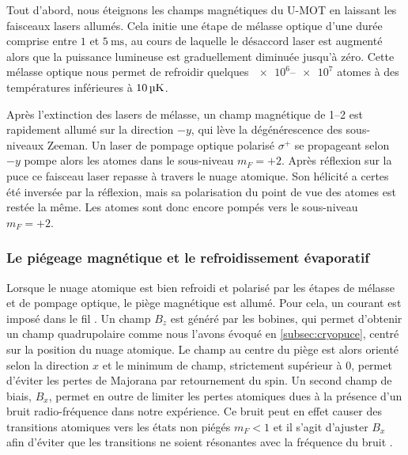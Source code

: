 Tout d'abord, nous éteignons les champs magnétiques du U-MOT en laissant les faisceaux lasers allumés.
Cela initie une étape de mélasse optique d'une durée comprise entre $\num{1}$ et $\SI{5}{\ms}$, au cours de laquelle le désaccord laser est augmenté alors que la puissance lumineuse est graduellement diminuée jusqu'à zéro.
Cette mélasse optique nous permet de refroidir quelques $\numrange{e6}{e7}$ atomes à des températures inférieures à $\SIvv{10}{\uK}$.

Après l'extinction des lasers de mélasse, un champ magnétique de \SIrange{1}{2}{\gauss} est rapidement allumé sur la direction $-y$, qui lève la dégénérescence des sous-niveaux Zeeman.
Un laser de pompage optique polarisé $\sigma ^+$ se propageant selon $-y$ pompe alors les atomes dans le sous-niveau $m_F=+2$.
Après réflexion sur la puce ce faisceau laser repasse à travers le nuage atomique.
Son hélicité a certes été inversée par la réflexion, mais sa polarisation du point de vue des atomes est restée la même.
Les atomes sont donc encore pompés vers le sous-niveau $m_F=+2$.

\subsubsection*{Le piégeage magnétique et le refroidissement évaporatif}
\noindent Lorsque le nuage atomique est bien refroidi et polarisé par les étapes de mélasse et de pompage optique, le piège magnétique est allumé.
Pour cela, un courant est imposé dans le fil .
Un champ $B_z$ est généré par les bobines, qui permet d'obtenir un champ quadrupolaire comme nous l'avons évoqué en \ref{subsec:cryopuce}, centré sur la position du nuage atomique.
Le champ au centre du piège est alors orienté selon la direction $x$ et le minimum de champ, strictement supérieur à $0$, permet d'éviter les pertes de Majorana par retournement du spin.
Un second champ de biais, $B_x$, permet en outre de limiter les pertes atomiques dues à la présence d'un bruit radio-fréquence dans notre expérience.
Ce bruit peut en effet causer des transitions atomiques vers les états non piégés $m_F<1$ et il s'agit d'ajuster $B_x$ afin d'éviter que les transitions ne soient résonantes avec la fréquence du bruit \cite{PHD_NIRRENGARTEN}.

